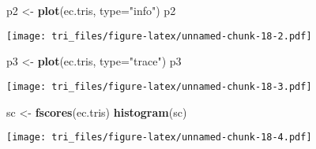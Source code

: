\documentclass[]{article}
\newenvironment{Shaded}{\begin{snugshade}}{\end{snugshade}}
\newcommand{\KeywordTok}[1]{\textcolor[rgb]{0.13,0.29,0.53}{\textbf{#1}}}
\newcommand{\DataTypeTok}[1]{\textcolor[rgb]{0.13,0.29,0.53}{#1}}
\newcommand{\StringTok}[1]{\textcolor[rgb]{0.31,0.60,0.02}{#1}}
\newcommand{\NormalTok}[1]{#1}
\begin{document}
\begin{Shaded}
\begin{Highlighting}[]
\NormalTok{p2 <-}\StringTok{ }\KeywordTok{plot}\NormalTok{(ec.tris, }\DataTypeTok{type=}\StringTok{"info"}\NormalTok{)}
\NormalTok{p2}
\end{Highlighting}
\end{Shaded}

\texttt{[image: tri\_files/figure-latex/unnamed-chunk-18-2.pdf]}

\begin{Shaded}
\begin{Highlighting}[]
\NormalTok{p3 <-}\StringTok{ }\KeywordTok{plot}\NormalTok{(ec.tris, }\DataTypeTok{type=}\StringTok{"trace"}\NormalTok{)}
\NormalTok{p3}
\end{Highlighting}
\end{Shaded}

\texttt{[image: tri\_files/figure-latex/unnamed-chunk-18-3.pdf]}

\begin{Shaded}
\begin{Highlighting}[]
\NormalTok{sc <-}\StringTok{ }\KeywordTok{fscores}\NormalTok{(ec.tris)}
\KeywordTok{histogram}\NormalTok{(sc)}
\end{Highlighting}
\end{Shaded}

\texttt{[image: tri\_files/figure-latex/unnamed-chunk-18-4.pdf]}
\end{document}
